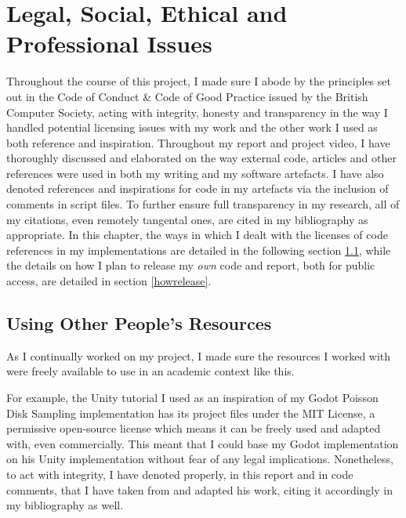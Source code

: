 \chapter{Legal, Social, Ethical and Professional Issues} \label{Issues}

Throughout the course of this project, I made sure I abode by the principles set out in the Code of Conduct \& Code of Good Practice issued by the British Computer Society\cite{bcscodeofconduct}, acting with integrity, honesty and transparency in the way I handled potential licensing issues with my work and the other work I used as both reference and inspiration. Throughout my report and project video, I have thoroughly discussed and elaborated on the way external code, articles and other references were used in both my writing and my software artefacts. I have also denoted references and inspirations for code in my artefacts via the inclusion of comments in script files. To further ensure full transparency in my research, all of my citations, even remotely tangental ones, are cited in my bibliography as appropriate. In this chapter, the ways in which I dealt with the licenses of code references in my implementations are detailed in the following section \ref{howuse}, while the details on how I plan to release my \textit{own} code and report, both for public access, are detailed in section \ref{howrelease}.  

\section{Using Other People's Resources} \label{howuse}

As I continually worked on my project, I made sure the resources I worked with were freely available to use in an academic context like this.

For example, the Unity tutorial I used as an inspiration of my Godot Poisson Disk Sampling implementation\cite{seblaguetuteYT} has its project files under the MIT License\cite{seblaguetuteGH}, a permissive open-source license which means it can be freely used and adapted with, even commercially.\cite{mitlicense} This meant that I could base my Godot implementation on his Unity implementation without fear of any legal implications. Nonetheless, to act with integrity, I have denoted properly, in this report and in code comments, that I have taken from and adapted his work, citing it accordingly in my bibliography as well.

